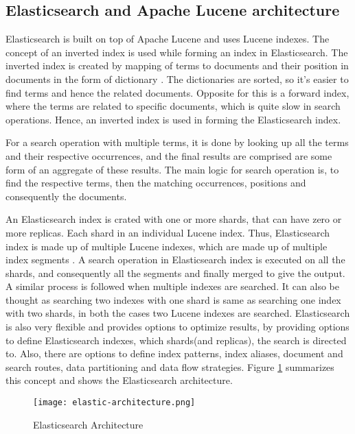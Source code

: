\subsection{Elasticsearch and Apache Lucene architecture}
Elasticsearch is built on top of Apache Lucene and uses Lucene indexes. The concept of an inverted index is used while forming an index in Elasticsearch. The inverted index is created by mapping of terms to documents and their position in documents in the form of dictionary \cite{alex2013elastic}.
The dictionaries are sorted, so it's easier to find terms and hence the related documents. Opposite for this is a forward index, where the terms are related to specific documents, which is quite slow in search operations. Hence, an inverted index is used in forming the Elasticsearch index.

For a search operation with multiple terms, it is done by looking up all the terms and their respective occurrences, and the final results are comprised are some form of an aggregate of these results.
The main logic for search operation is, to find the respective terms, then the matching occurrences,  positions and consequently the documents. 

An Elasticsearch index is crated with one or more shards, that can have zero or more replicas. Each shard in an individual Lucene index. Thus, Elasticsearch index is made up of multiple Lucene indexes, which are made up of multiple index segments \cite{alex2013elastic}. A search operation in Elasticsearch index is executed on all the shards, and consequently all the segments and finally merged to give the output. A similar process is followed when multiple indexes are searched. It can also be thought as searching two indexes with one shard is same as searching one index with two shards, in both the cases two Lucene indexes are searched. Elasticsearch is also very flexible and provides options to optimize results, by providing options to define Elasticsearch indexes, which shards(and replicas), the search is directed to. Also, there are options to define index patterns, index aliases, document and search routes, data partitioning and data flow strategies. Figure \ref{fig:elasticsearch-architecture} summarizes this concept and shows the Elasticsearch architecture.

\begin{figure}
    \centering
    \texttt{[image: elastic-architecture.png]}
    \caption{Elasticsearch Architecture}
    \label{fig:elasticsearch-architecture}
\end{figure}


